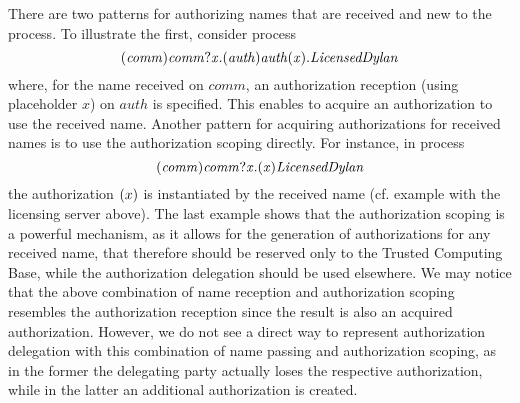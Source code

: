 There are two patterns for authorizing names that are received and new to the process. To illustrate the first, consider process
\[
{(\mathit{comm})\mathit{comm}?\mathit{x}.
(\mathit{auth})\mathit{auth}(\mathit{x}).
\mathit{LicensedDylan}}
\]
where, for the name received on $\mathit{comm}$, an authorization
reception (using placeholder $x$) on $\mathit{auth}$ is specified. This enables to acquire an 
authorization to use the received name. Another pattern for acquiring authorizations for received names is to use the 
authorization scoping directly. For instance, in process
\[
{(\mathit{comm})\mathit{comm}?\mathit{x}.
(\mathit{x})\mathit{LicensedDylan}}
\]
the authorization $(x)$ is instantiated by the received name (cf. example with the licensing server above).
The last example shows that the authorization scoping is a powerful 
mechanism, as it allows for the generation of authorizations for any received name, that therefore should be reserved only to the 
Trusted Computing Base, while the authorization delegation should be used elsewhere.
We may notice that the above combination of name reception and authorization scoping resembles the authorization reception since the result is also an acquired authorization. However, we do not see a 
direct way to represent authorization delegation with this combination of name passing and authorization scoping, as in the former the delegating party actually loses the respective authorization, while in the latter an additional authorization is created. 






